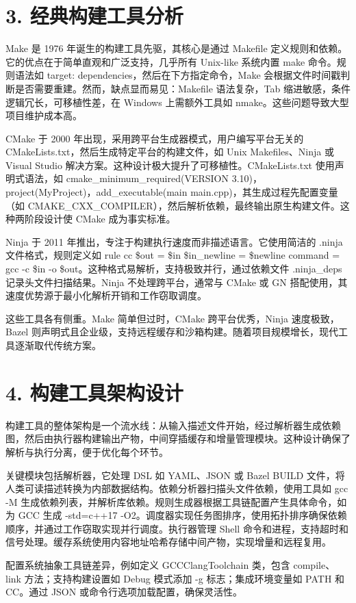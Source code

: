 \chapter{3. 经典构建工具分析}
Make 是 1976 年诞生的构建工具先驱，其核心是通过 Makefile 定义规则和依赖。它的优点在于简单直观和广泛支持，几乎所有 Unix-like 系统内置 make 命令。规则语法如 target: dependencies，然后在下方指定命令，Make 会根据文件时间戳判断是否需要重建。然而，缺点显而易见：Makefile 语法复杂，Tab 缩进敏感，条件逻辑冗长，可移植性差，在 Windows 上需额外工具如 nmake。这些问题导致大型项目维护成本高。\par
CMake 于 2000 年出现，采用跨平台生成器模式，用户编写平台无关的 CMakeLists.txt，然后生成特定平台的构建文件，如 Unix Makefiles、Ninja 或 Visual Studio 解决方案。这种设计极大提升了可移植性。CMakeLists.txt 使用声明式语法，如 cmake\_{}minimum\_{}required(VERSION 3.10)，project(MyProject)，add\_{}executable(main main.cpp)，其生成过程先配置变量（如 CMAKE\_{}CXX\_{}COMPILER），然后解析依赖，最终输出原生构建文件。这种两阶段设计使 CMake 成为事实标准。\par
Ninja 于 2011 年推出，专注于构建执行速度而非描述语言。它使用简洁的 .ninja 文件格式，规则定义如 rule cc \${}out = \${}in \${}in\_{}newline = \${}newline command = gcc -c \${}in -o \${}out。这种格式易解析，支持极致并行，通过依赖文件 .ninja\_{}deps 记录头文件扫描结果。Ninja 不处理跨平台，通常与 CMake 或 GN 搭配使用，其速度优势源于最小化解析开销和工作窃取调度。\par
这些工具各有侧重。Make 简单但过时，CMake 跨平台优秀，Ninja 速度极致，Bazel 则声明式且企业级，支持远程缓存和沙箱构建。随着项目规模增长，现代工具逐渐取代传统方案。\par
\chapter{4. 构建工具架构设计}
构建工具的整体架构是一个流水线：从输入描述文件开始，经过解析器生成依赖图，然后由执行器构建输出产物，中间穿插缓存和增量管理模块。这种设计确保了解析与执行分离，便于优化每个环节。\par
关键模块包括解析器，它处理 DSL 如 YAML、JSON 或 Bazel BUILD 文件，将人类可读描述转换为内部数据结构。依赖分析器扫描头文件依赖，使用工具如 gcc -M 生成依赖列表，并解析库依赖。规则生成器根据工具链配置产生具体命令，如为 GCC 生成 -std=c++17 -O2。调度器实现任务图排序，使用拓扑排序确保依赖顺序，并通过工作窃取实现并行调度。执行器管理 Shell 命令和进程，支持超时和信号处理。缓存系统使用内容地址哈希存储中间产物，实现增量和远程复用。\par
配置系统抽象工具链差异，例如定义 GCCClangToolchain 类，包含 compile、link 方法；支持构建设置如 Debug 模式添加 -g 标志；集成环境变量如 PATH 和 CC。通过 JSON 或命令行选项加载配置，确保灵活性。\par
